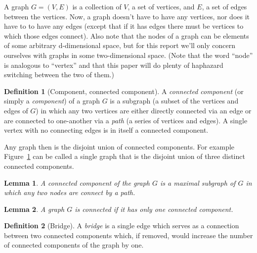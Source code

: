 \documentclass{amsart}
\theoremstyle{plain}
\newtheorem*{lemma*}{Lemma}
\theoremstyle{remark}
\theoremstyle{definition}
\newtheorem*{definition*}{Definition}
\newenvironment{definition}%
	{\begin{leftbar}\begin{definition*}
}{%
	\end{definition*}\end{leftbar}
}
\begin{document}
A graph $G=(V,E)$ is a collection of $V$, a set of vertices, and $E$, a set of
edges between the vertices.
Now, a graph doesn't have to have any vertices, nor
does it have to to have any edges (except that if it has edges there must be
vertices to which those edges connect).
Also note that the nodes of a graph can be elements of some arbitrary
d-dimensional space, but for this report we'll only concern ourselves with
graphs in some two-dimensional space.
(Note that the word ``node'' is analogous to ``vertex'' and that this paper
will do plenty of haphazard switching between the two of them.)
\begin{definition}[Component, connected component]
  A \emph{connected component} (or simply a \emph{component}) of a graph $G$ is
  a subgraph (a subset of the vertices and edges of $G$) in which any two
  vertices are either directly connected via an edge or are connected to
  one-another via a \emph{path} (a series of vertices and edges). A single
  vertex with no connecting edges is in itself a connected component.
\end{definition}
Any graph then is the disjoint union of connected components.
For example Figure~\ref{fig:disjoint-union} can be called a single graph that is the disjoint
union of three distinct connected components.
\begin{figure}[ht]
  \caption[Disjoin union]{}
  \label{fig:disjoint-union}
\end{figure}
\begin{lemma*}
  A connected component of the graph $G$ is a maximal subgraph of $G$ in which
  any two nodes are connect by a path.
\end{lemma*}
\begin{lemma*}
  A graph $G$ is \emph{connected} if it has only one connected component.
\end{lemma*}
\begin{definition}[Bridge]
  A \emph{bridge} is a single edge which serves as a connection between two connected
  components which, if removed, would increase the number of connected
  components of the graph by one.
\end{definition}
\end{document}
